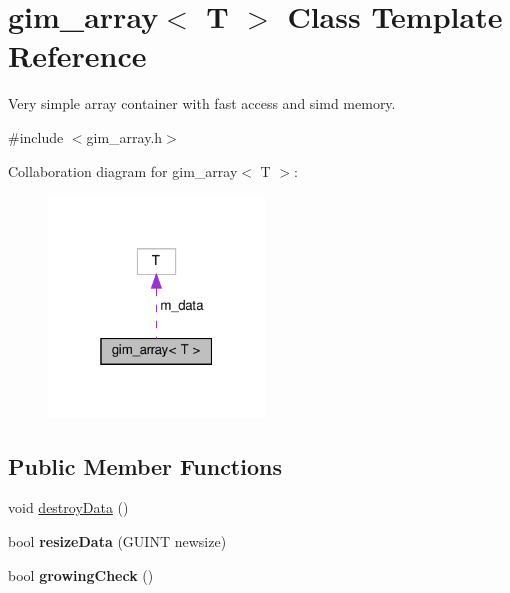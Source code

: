 \hypertarget{classgim__array}{}\section{gim\+\_\+array$<$ T $>$ Class Template Reference}
\label{classgim__array}


Very simple array container with fast access and simd memory.  




{\ttfamily \#include $<$gim\+\_\+array.\+h$>$}



Collaboration diagram for gim\+\_\+array$<$ T $>$\+:
\nopagebreak
\begin{figure}[H]
\begin{center}
\leavevmode
\includegraphics[width=163pt]{classgim__array__coll__graph}
\end{center}
\end{figure}
\subsection*{Public Member Functions}
\textbf{ }\par
\begin{DoxyCompactItemize}
\item 
void \hyperlink{classgim__array_aa7a9dca42674415635846cd077cb4a97}{destroy\+Data} ()
\item 
\mbox{\label{classgim__array_a9d4559f0f847dd3ff602e0b828df31f2}} 
bool {\bfseries resize\+Data} (G\+U\+I\+NT newsize)
\item 
\mbox{\label{classgim__array_aa9c596ff1639a5f6c69c16f25710f7d1}} 
bool {\bfseries growing\+Check} ()
\end{DoxyCompactItemize}

